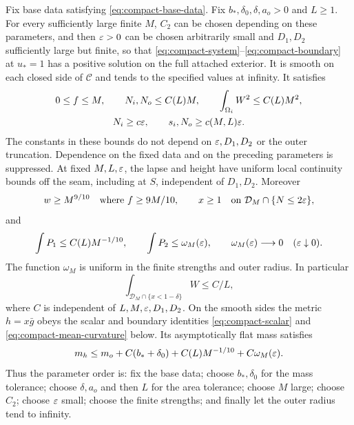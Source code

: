 \begin{proposition}\label{prop:compact-solutions}
Fix base data satisfying \eqref{eq:compact-base-data}. Fix
$b_*,\delta_0,\delta,a_o>0$ and $L\ge1$. For every sufficiently large
finite $M$, $C_2$ can be chosen depending on these parameters, and then
$\varepsilon>0$ can be chosen arbitrarily small and $D_1,D_2$ sufficiently
large but finite, so that \eqref{eq:compact-system}--\eqref{eq:compact-boundary}
at $u_*=1$ has a positive solution on the full attached exterior.
It is smooth on each closed side of $\mathcal C$ and tends to the
specified values at infinity. It satisfies
\begin{equation}\label{eq:compact-bounds}
 \begin{gathered}
 0\le f\le M,\qquad N_i,N_o\le C(L)M,\qquad
 \int_{\Omega_i}W^2\le C(L)M^2,\\
 N_i\ge c\varepsilon,\qquad s_i,N_o\ge c(M,L)\varepsilon.
 \end{gathered}
\end{equation}
The constants in these bounds do not depend on $\varepsilon,D_1,D_2$ or the
outer truncation. Dependence on the fixed data and on the preceding
parameters is suppressed. At fixed $M,L,\varepsilon$, the lapse and height
have uniform local continuity bounds off the seam, including at $S$,
independent of $D_1,D_2$. Moreover
\begin{equation}\label{eq:compact-penalty-targets}
 w\ge M^{9/10}\quad\text{where }f\ge9M/10,
 \qquad x\ge1\quad\text{on }\mathcal D_M\cap\{N\le2\varepsilon\},
\end{equation}
and
\begin{equation}\label{eq:compact-penalty-cost}
 \int P_1\le C(L)M^{-1/10},\qquad
 \int P_2\le\omega_M(\varepsilon),\qquad \omega_M(\varepsilon)\longrightarrow0
 \quad(\varepsilon\downarrow0).
\end{equation}
The function $\omega_M$ is uniform in the finite strengths and outer
radius. In particular
\begin{equation}\label{eq:compact-bad-volume}
 \int_{\mathcal D_M\cap\{x<1-\delta\}}W\le C/L,
\end{equation}
where $C$ is independent of $L,M,\varepsilon,D_1,D_2$. On the smooth sides the
metric $h=x\bar g$ obeys the scalar and boundary identities
\eqref{eq:compact-scalar} and \eqref{eq:compact-mean-curvature} below.
Its asymptotically flat mass satisfies
\begin{equation}\label{eq:compact-mass-budget}
 m_h\le m_o+C(b_*+\delta_0)+C(L)M^{-1/10}+C\omega_M(\varepsilon).
\end{equation}
Thus the parameter order is: fix the base data; choose $b_*,\delta_0$
for the mass tolerance; choose $\delta,a_o$ and then $L$ for the area
tolerance; choose $M$ large; choose $C_2$; choose $\varepsilon$ small; choose
the finite strengths; and finally let the outer radius tend to infinity.
\end{proposition}

